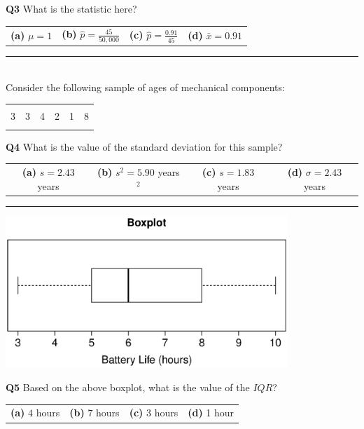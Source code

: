 \documentclass[12pt]{article}
\begin{document}
{\bf Q3} What is the statistic here?\\[0.2cm]
\begin{tabular}{cccc}
{\bf(a)} $\mu = 1$ & {\bf(b)} $\hat p = \frac{45}{50,000}$ & {\bf(c)} $\hat p = \frac{0.91}{45}$ & {\bf(d)} $\bar x = 0.91$ \\[0.6cm]
\end{tabular}



\rule{\linewidth}{1pt}

\quad\\
Consider the following sample of ages of mechanical components:
\begin{center}
\begin{tabular}{|cccccc|}
\hline
&&&&&\\[-0.4cm]
3 & 3 & 4 & 2 & 1 & 8\\
\hline
\multicolumn{6}{c}{}
\end{tabular}
\end{center}


{\bf Q4} What is the value of the standard deviation for this sample?\\[0.2cm]
\begin{tabular}{cccc}
{\bf(a)} $s = 2.43$ years  & {\bf(b)} $s^2 = 5.90$ years$^2$ & {\bf(c)} $s = 1.83$ years & {\bf(d)} $\sigma = 2.43$ years \\[0.6cm]
\end{tabular}

\quad


\rule{\linewidth}{1pt}

\begin{center}
\includegraphics[width=0.8\textwidth, trim = 1.3cm 0.6cm 1cm 0.8cm, clip]{Boxplot}
\end{center}

{\bf Q5} Based on the above boxplot, what is the value of the $IQR$?\\[0.2cm]
\begin{tabular}{cccc}
{\bf(a)} $4$ hours & {\bf(b)} $7$ hours & {\bf(c)} $3$ hours & {\bf(d)} 1 hour \\[0.6cm]
\end{tabular}
\end{document}
